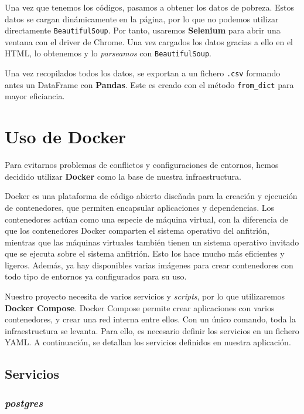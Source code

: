 \documentclass[11pt,a4paper]{article}
\begin{document}
Una vez que tenemos los códigos, pasamos a obtener los datos de pobreza. Estos datos se cargan dinámicamente en la página, por lo que no podemos utilizar directamente \lstinline!BeautifulSoup!. Por tanto, usaremos \textbf{Selenium} para abrir una ventana con el driver de Chrome. Una vez cargados los datos gracias a ello en el HTML, lo obtenemos y lo \textit{parseamos} con \lstinline!BeautifulSoup!.

Una vez recopilados todos los datos, se exportan a un fichero \lstinline!.csv! formando antes un DataFrame con \textbf{Pandas}. Este es creado con el método \lstinline!from_dict! para mayor eficiancia.

\section{Uso de Docker}

Para evitarnos problemas de conflictos y configuraciones de entornos, hemos decidido utilizar \textbf{Docker} como la base de nuestra infraestructura.

Docker es una plataforma de código abierto diseñada para la creación y ejecución de contenedores, que permiten encapsular aplicaciones y dependencias. Los contenedores actúan como una especie de máquina virtual, con la diferencia de que los contenedores Docker comparten el sistema operativo del anfitrión, mientras que las máquinas virtuales también tienen un sistema operativo invitado que se ejecuta sobre el sistema anfitrión. Esto los hace mucho más eficientes y ligeros. Además, ya hay disponibles varias imágenes para crear contenedores con todo tipo de entornos ya configurados para su uso.

Nuestro proyecto necesita de varios servicios y \textit{scripts}, por lo que utilizaremos \textbf{Docker Compose}. Docker Compose permite crear aplicaciones con varios contenedores, y crear una red interna entre ellos. Con un único comando, toda la infraestructura se levanta. Para ello, es necesario definir los servicios en un fichero YAML. A continuación, se detallan los servicios definidos en nuestra aplicación.

\subsection{Servicios}

\subsubsection*{\textit{postgres}}
\end{document}
